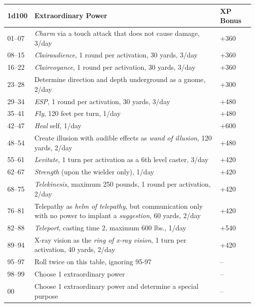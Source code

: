 \begin{multicols}{2}
\begin{minipage}{\columnwidth}
\end{minipage}

\noindent \begin{minipage}{\columnwidth}

\label{extraordinarypowers}
\noindent \begin{tabular}{|p{}|p{}|p{}|}
\hline
1d100	& Extraordinary Power	& XP Bonus \\
\hline\hline
\rowcolor[gray]{0.9}01--07	& \textit{Charm} via a touch attack that does not cause damage, 3/day 	& +360 \\
08--15	& \textit{Clairaudience}, 1 round per activation, 30 yards, 3/day	& +360 \\
\rowcolor[gray]{0.9}16--22	& \textit{Clairvoyance}, 1 round per activation, 30 yards, 3/day	& +360 \\
23--28	& Determine direction and depth underground as a gnome, 2/day	& +300 \\
\rowcolor[gray]{0.9}29--34	& \textit{ESP}, 1 round per activation, 30 yards, 3/day	& +480 \\
35--41	& \textit{Fly}, 120 feet per turn, 1/day	& +480 \\
\rowcolor[gray]{0.9}42--47	& \textit{Heal} self, 1/day	& +600 \\
48--54	& Create illusion with audible effects as \textit{wand of illusion}, 120 yards, 2/day	& +480 \\
\rowcolor[gray]{0.9}55--61	& \textit{Levitate}, 1 turn per activation as a 6th level caster, 3/day	& +420 \\
62--67	& \textit{Strength} (upon the wielder only), 1/day	& +420 \\
\rowcolor[gray]{0.9}68--75	& \textit{Telekinesis}, maximum 250 pounds, 1 round per activation, 2/day	& +420 \\
76--81	& Telepathy as \textit{helm of telepathy}, but communication only with no power to implant a \textit{suggestion}, 60 yards, 2/day	& +420 \\
\rowcolor[gray]{0.9}82--88	& \textit{Teleport}, casting time 2, maximum 600 lbs., 1/day	& +540 \\
89--94	& X-ray vision as the \textit{ring of x-ray vision}, 1 turn per activation, 40 yards, 2/day	& +420 \\
\rowcolor[gray]{0.9}95--97	& Roll twice on this table, ignoring 95-97	& -- \\
98--99	& Choose 1 extraordinary power	& -- \\
\rowcolor[gray]{0.9}00	& Choose 1 extraordinary power and determine a special purpose	& -- \\
\hline
\end{tabular}


\end{minipage}
\end{multicols}
